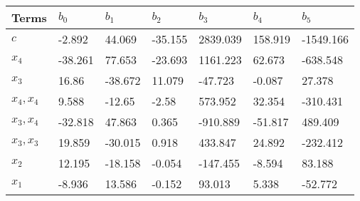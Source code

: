 \begin{tabular}{lllllll}
Terms & $b_0$ & $b_1$ & $b_2$ & $b_3$ & $b_4$ & $b_5$ \\ 
\hline 
$c$ & -2.892 & 44.069 & -35.155 & 2839.039 & 158.919 & -1549.166 \\ 
$x_4$ & -38.261 & 77.653 & -23.693 & 1161.223 & 62.673 & -638.548 \\ 
$x_3$ & 16.86 & -38.672 & 11.079 & -47.723 & -0.087 & 27.378 \\ 
$x_4,x_4$ & 9.588 & -12.65 & -2.58 & 573.952 & 32.354 & -310.431 \\ 
$x_3,x_4$ & -32.818 & 47.863 & 0.365 & -910.889 & -51.817 & 489.409 \\ 
$x_3,x_3$ & 19.859 & -30.015 & 0.918 & 433.847 & 24.892 & -232.412 \\ 
$x_2$ & 12.195 & -18.158 & -0.054 & -147.455 & -8.594 & 83.188 \\ 
$x_1$ & -8.936 & 13.586 & -0.152 & 93.013 & 5.338 & -52.772 \\ 
\hline 
\end{tabular}